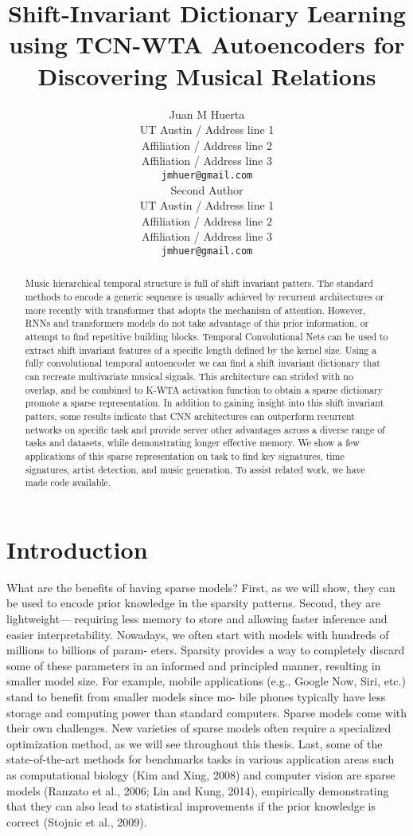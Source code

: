 \documentclass[11pt,a4paper]{article}
\title{Shift-Invariant Dictionary Learning using TCN-WTA Autoencoders for Discovering Musical Relations }
\author{Juan M Huerta \\
  UT Austin / Address line 1 \\
  Affiliation / Address line 2 \\
  Affiliation / Address line 3 \\
  \texttt{jmhuer@gmail.com} \\\And
  Second Author \\
  UT Austin / Address line 1 \\
  Affiliation / Address line 2 \\
  Affiliation / Address line 3 \\
  \texttt{jmhuer@gmail.com} \\}
\date{}
\begin{document}
\maketitle
\begin{abstract}
Music hierarchical temporal structure is full of shift invariant patters. The standard methods to encode a generic sequence is usually achieved by recurrent architectures or more recently with transformer that adopts the mechanism of attention. However, RNNs and transformers models do not take advantage of this prior information, or attempt to find repetitive building blocks. Temporal Convolutional Nets can be used to extract shift invariant features of a specific length defined by the kernel size. Using a fully convolutional temporal autoencoder we can find a shift invariant dictionary that can recreate multivariate musical signals. This architecture can strided with no overlap, and be combined to K-WTA activation function to obtain a sparse dictionary promote a sparse representation. In addition to gaining insight into this shift invariant patters, some results indicate that CNN architectures can outperform recurrent networks on specific task and provide server other advantages across a diverse range of tasks and datasets, while demonstrating longer effective memory. We show a few applications of this sparse representation on task to find key signatures, time signatures, artist detection, and music generation. To assist related work, we have made code available. 
\end{abstract}

\section{Introduction}

What are the benefits of having sparse models? First, as we will show, they can be used to encode prior knowledge in the sparsity patterns. Second, they are lightweight— requiring less memory to store and allowing faster inference and easier interpretability. Nowadays, we often start with models with hundreds of millions to billions of param- eters. Sparsity provides a way to completely discard some of these parameters in an informed and principled manner, resulting in smaller model size. For example, mobile applications (e.g., Google Now, Siri, etc.) stand to benefit from smaller models since mo- bile phones typically have less storage and computing power than standard computers. Sparse models come with their own challenges. New varieties of sparse models often require a specialized optimization method, as we will see throughout this thesis. Last, some of the state-of-the-art methods for benchmarks tasks in various application areas such as computational biology (Kim and Xing, 2008) and computer vision are sparse models (Ranzato et al., 2006; Lin and Kung, 2014), empirically demonstrating that they can also lead to statistical improvements if the prior knowledge is correct (Stojnic et al., 2009).
\end{document}
